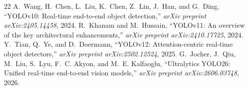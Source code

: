 \documentclass[conference]{IEEEtran}
\begin{document}
\begin{thebibliography}{22}
 A.~Wang, H.~Chen, L.~Liu, K.~Chen, Z.~Lin, J.~Han, and G.~Ding, ``YOLOv10: Real-time end-to-end object detection,'' \emph{arXiv preprint arXiv:2405.14458}, 2024.
 R.~Khanam and M.~Hussain, ``YOLOv11: An overview of the key architectural enhancements,'' \emph{arXiv preprint arXiv:2410.17725}, 2024.
 Y.~Tian, Q.~Ye, and D.~Doermann, ``YOLOv12: Attention-centric real-time object detectors,'' \emph{arXiv preprint arXiv:2502.12524}, 2025.
 G.~Jocher, J.~Qiu, M.~Liu, S.~Lyu, F.~C. Akyon, and M.~E. Kalfaoglu, ``Ultralytics YOLO26: Unified real-time end-to-end vision models,'' \emph{arXiv preprint arXiv:2606.03748}, 2026.
\end{thebibliography}
\end{document}
